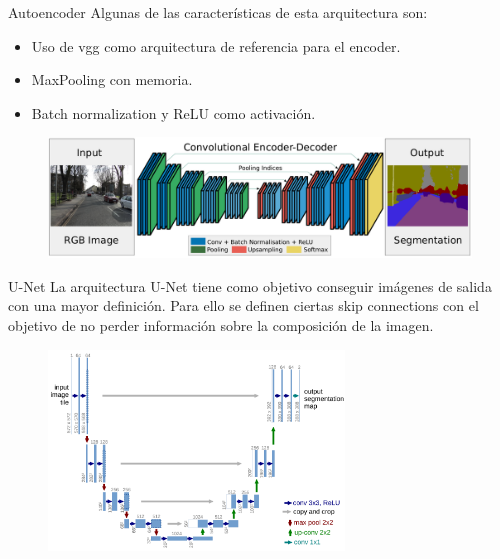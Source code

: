 \begin{frame}{Autoencoder}
Algunas de las características de esta arquitectura son:
\begin{itemize}
    \item Uso de \alert{\gls{vgg}} como arquitectura de referencia para el \alert{encoder}.
    \item MaxPooling \alert{con memoria}.
    \item \alert{Batch normalization} y \alert{ReLU} como activación.
\end{itemize}

\begin{figure}
    \centering
    \includegraphics[width=\textwidth]{Slides/figures/Tema 4/SegNet.png}
    \caption{\cite{badrinarayanan2015segnet}}
\end{figure}
\end{frame}

\begin{frame}{U-Net}
La arquitectura \alert{U-Net}\cite{ronneberger2015u} tiene como objetivo conseguir \alert{imágenes de salida} con una mayor definición. Para ello se definen ciertas \alert{skip connections} con el objetivo de no \alert{perder información} sobre la composición de la imagen.

\begin{figure}
    \centering
    \includegraphics[width=0.7\textwidth]{Slides/figures/Tema 4/U-Net.png}
    \caption{\cite{ronneberger2015u}}
\end{figure}
\end{frame}

